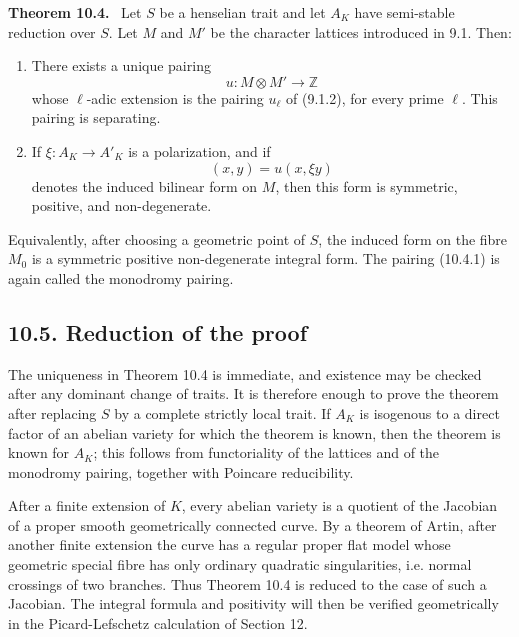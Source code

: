 \documentclass[11pt]{article}
\newcommand{\Z}{\mathbb Z}
\newenvironment{statement}[1]{\par\medskip\noindent\textbf{#1.}\ }{\par\medskip}
\begin{document}
\begin{statement}{Theorem 10.4}
Let \(S\) be a henselian trait and let \(A_K\) have semi-stable reduction over \(S\).  Let \(M\) and \(M'\) be the character lattices introduced in 9.1.  Then:
\begin{enumerate}[label=\alph*)]
\item There exists a unique pairing
\begin{equation}\tag{10.4.1}
        u:M\otimes M'\longrightarrow \Z
\end{equation}
whose \(\ell\)-adic extension is the pairing \(u_\ell\) of (9.1.2), for every prime \(\ell\).  This pairing is separating.
\item If \(\xi:A_K\to A'_K\) is a polarization, and if
\begin{equation}\tag{10.4.2}
        (x,y)=u(x,\xi y)
\end{equation}
denotes the induced bilinear form on \(M\), then this form is symmetric, positive, and non-degenerate.
\end{enumerate}
\end{statement}
Equivalently, after choosing a geometric point of \(S\), the induced form on the fibre \(M_0\) is a symmetric positive non-degenerate integral form.  The pairing (10.4.1) is again called the monodromy pairing.

\subsection*{10.5. Reduction of the proof}
The uniqueness in Theorem 10.4 is immediate, and existence may be checked after any dominant change of traits.  It is therefore enough to prove the theorem after replacing \(S\) by a complete strictly local trait.  If \(A_K\) is isogenous to a direct factor of an abelian variety for which the theorem is known, then the theorem is known for \(A_K\); this follows from functoriality of the lattices and of the monodromy pairing, together with Poincare reducibility.

After a finite extension of \(K\), every abelian variety is a quotient of the Jacobian of a proper smooth geometrically connected curve.  By a theorem of Artin, after another finite extension the curve has a regular proper flat model whose geometric special fibre has only ordinary quadratic singularities, i.e. normal crossings of two branches.  Thus Theorem 10.4 is reduced to the case of such a Jacobian.  The integral formula and positivity will then be verified geometrically in the Picard-Lefschetz calculation of Section 12.
\end{document}
